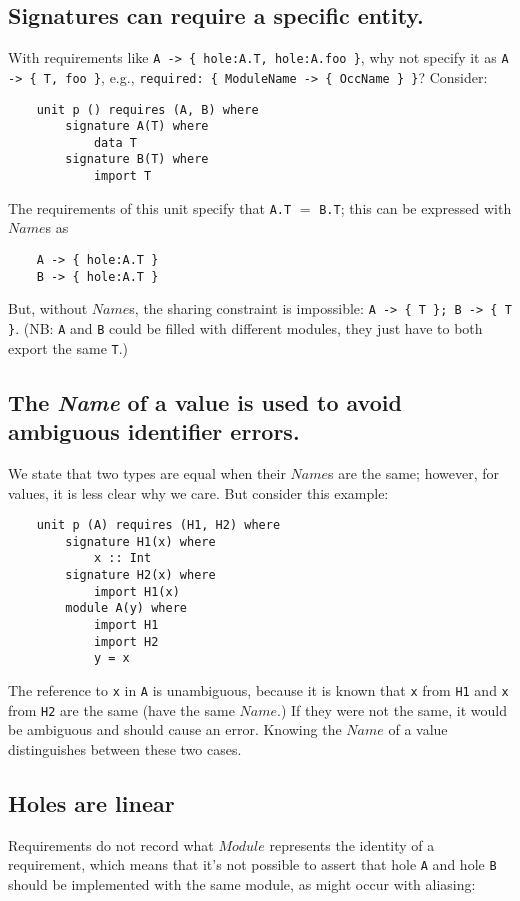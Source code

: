 \documentclass{article}
\newcommand{\I}[1]{\ensuremath{\mathit{#1}}}
\begin{document}
\subsection{Signatures can require a specific entity.}
With requirements like \verb|A -> { hole:A.T, hole:A.foo }|,
why not specify it as \verb|A -> { T, foo }|,
e.g., \verb|required: { ModuleName -> { OccName } }|?  Consider:

\begin{verbatim}
    unit p () requires (A, B) where
        signature A(T) where
            data T
        signature B(T) where
            import T
\end{verbatim}
The requirements of this unit specify that \verb|A.T| $=$ \verb|B.T|; this
can be expressed with \I{Name}s as

\begin{verbatim}
    A -> { hole:A.T }
    B -> { hole:A.T }
\end{verbatim}
But, without \I{Name}s, the sharing constraint is impossible:  \verb|A -> { T }; B -> { T }|. (NB: \verb|A| and \verb|B| could be filled with different modules, they just have
to both export the same \verb|T|.)

\subsection{The \textit{Name} of a value is used to avoid
ambiguous identifier errors.}
We state that two types
are equal when their \I{Name}s are the same; however,
for values, it is less clear why we care.  But consider this example:

\begin{verbatim}
    unit p (A) requires (H1, H2) where
        signature H1(x) where
            x :: Int
        signature H2(x) where
            import H1(x)
        module A(y) where
            import H1
            import H2
            y = x
\end{verbatim}
The reference to \verb|x| in \verb|A| is unambiguous, because it is known
that \verb|x| from \verb|H1| and \verb|x| from \verb|H2| are the same (have
the same \I{Name}.)  If they were not the same, it would be ambiguous and
should cause an error.  Knowing the \I{Name} of a value distinguishes
between these two cases.

\subsection{Holes are linear}
Requirements do not record what \I{Module} represents
the identity of a requirement, which means that it's not possible to assert
that hole \verb|A| and hole \verb|B| should be implemented with the same module,
as might occur with aliasing:
\end{document}
